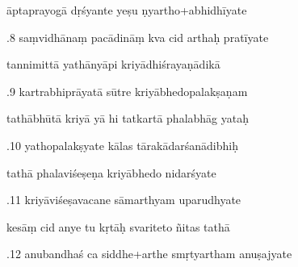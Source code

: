 \documentclass[article,12pt,a4paper]{memoir}%
\newcounter{parCount}
\begin{document}
	  
	  \pstart \leavevmode%
	āptaprayogā dṛśyante yeṣu ṇyartho+abhidhīyate 
	{}
	\pend%
      

	  
	  \pstart {}.8 saṃvidhānaṃ pacādināṃ kva cid arthaḥ pratīyate 
	{}
	\pend%
      

	  
	  \pstart \leavevmode%
	tannimittā yathānyāpi kriyādhiśrayaṇādikā 
	{}
	\pend%
      

	  
	  \pstart {}.9 kartrabhiprāyatā sūtre kriyābhedopalakṣaṇam 
	{}
	\pend%
      

	  
	  \pstart \leavevmode%
	tathābhūtā kriyā yā hi tatkartā phalabhāg yataḥ 
	{}
	\pend%
      

	  
	  \pstart {}.10 yathopalakṣyate kālas tārakādarśanādibhiḥ 
	{}
	\pend%
      

	  
	  \pstart \leavevmode%
	tathā phalaviśeṣeṇa kriyābhedo nidarśyate 
	{}
	\pend%
      

	  
	  \pstart {}.11 kriyāviśeṣavacane sāmarthyam uparudhyate 
	{}
	\pend%
      

	  
	  \pstart \leavevmode%
	kesāṃ cid anye tu kṛtāḥ svariteto ñitas tathā 
	{}
	\pend%
      

	  
	  \pstart {}.12 anubandhaś ca siddhe+arthe smṛtyartham anuṣajyate 
	{}
	\pend%
      
\end{document}
